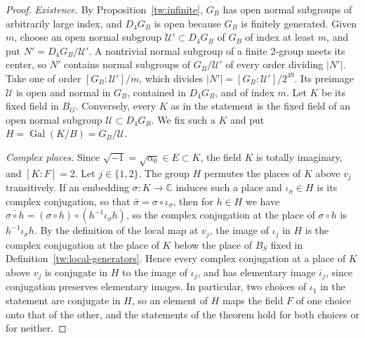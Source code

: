 \documentclass[11pt]{amsart}
\numberwithin{equation}{section}
\theoremstyle{definition}
\theoremstyle{remark}
\DeclareMathOperator{\Gal}{Gal}
\newcommand{\C}{\mathbb C}
\begin{document}
\begin{proof}
\emph{Existence.} By Proposition~\ref{tw:infinite}, $G_B$ has open normal
subgroups of arbitrarily large index, and $D_4G_B$ is open because $G_B$ is
finitely generated. Given $m$, choose an open normal subgroup
$\mathcal U'\subset D_4G_B$ of $G_B$ of index at least $m$, and put
$N'=D_4G_B/\mathcal U'$. A nontrivial normal subgroup of a finite $2$-group
meets its center, so $N'$ contains normal subgroups of $G_B/\mathcal U'$ of
every order dividing $|N'|$. Take one of order $[G_B:\mathcal U']/m$, which
divides $|N'|=[G_B:\mathcal U']/2^{49}$. Its preimage $\mathcal U$ is open and
normal in $G_B$, contained in $D_4G_B$, and of index $m$. Let $K$ be its fixed
field in $B_G$. Conversely, every $K$ as in the statement is the fixed field
of an open normal subgroup $\mathcal U\subset D_4G_B$. We fix such a $K$ and put
$H=\Gal(K/B)=G_B/\mathcal U$.

\emph{Complex places.} Since $\sqrt{-1}=\sqrt{\alpha_0}\in E\subset K$, the
field $K$ is totally imaginary, and $[K:F]=2$. Let $j\in\{1,2\}$. The group
$H$ permutes the places of $K$ above $v_j$ transitively. If an embedding
$\sigma\colon K\to\C$ induces such a place and $\iota_\sigma\in H$ is its
complex conjugation, so that $\bar\sigma=\sigma\circ\iota_\sigma$, then for
$h\in H$ we have
$\overline{\sigma\circ h}=(\sigma\circ h)\circ(h^{-1}\iota_\sigma h)$, so the
complex conjugation at the place of $\sigma\circ h$ is
$h^{-1}\iota_\sigma h$. By the definition of
the local map at $v_j$, the image of $\iota_j$ in $H$ is the complex
conjugation at the place of $K$ below the place of $B_S$ fixed in
Definition~\ref{tw:local-generators}. Hence every complex conjugation at a
place of $K$ above $v_j$ is conjugate in $H$ to the image of $\iota_j$, and
has elementary image $\bar\iota_j$, since conjugation preserves elementary
images. In particular, two choices of $\iota_1$ in the statement are
conjugate in $H$, so an element of $H$ maps the field $F$ of one choice onto
that of the other, and the statements of the theorem hold for both choices
or for neither.


\end{proof}
\end{document}
